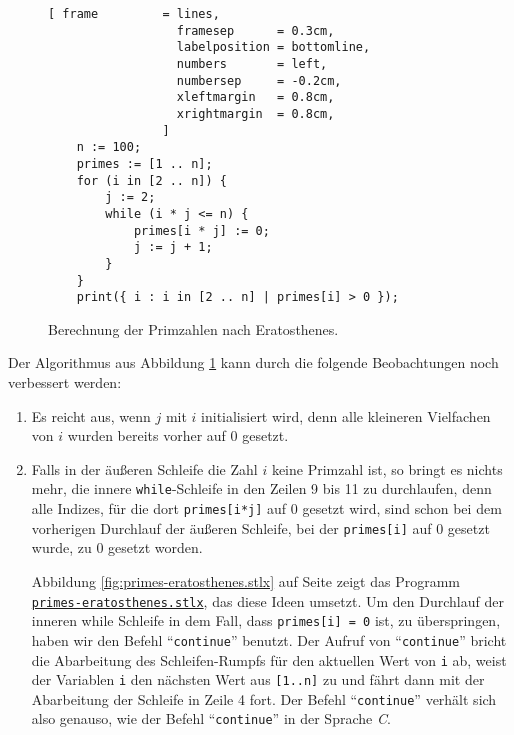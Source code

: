 \begin{figure}[!ht]
  \centering
\begin{Verbatim}[ frame         = lines, 
                  framesep      = 0.3cm, 
                  labelposition = bottomline,
                  numbers       = left,
                  numbersep     = -0.2cm,
                  xleftmargin   = 0.8cm,
                  xrightmargin  = 0.8cm,
                ]
    n := 100;
    primes := [1 .. n];
    for (i in [2 .. n]) {
        j := 2;
        while (i * j <= n) {
            primes[i * j] := 0;
            j := j + 1;
        }
    }
    print({ i : i in [2 .. n] | primes[i] > 0 });
\end{Verbatim} 
\vspace*{-0.3cm}
\caption{Berechnung der Primzahlen nach Eratosthenes.}  \label{fig:primes-for.stlx}
\end{figure} %

Der Algorithmus aus Abbildung \ref{fig:primes-for.stlx} kann durch die folgende Beobachtungen
noch verbessert werden: 
\begin{enumerate}
\item Es reicht aus, wenn $j$ mit $i$ initialisiert wird, denn alle kleineren Vielfachen von $i$
      wurden bereits vorher auf 0 gesetzt.
\item Falls in der äußeren Schleife die Zahl $i$ keine Primzahl ist, so bringt es nichts mehr, die
      innere \texttt{while}-Schleife in den Zeilen 9 bis 11 zu durchlaufen, denn alle
      Indizes, für die dort \texttt{primes[i*j]} auf 0 gesetzt wird, sind schon bei dem
      vorherigen Durchlauf der äußeren Schleife, bei der \texttt{primes[i]}
      auf 0 gesetzt wurde, zu 0 gesetzt worden. 

      Abbildung \ref{fig:primes-eratosthenes.stlx} auf Seite
      \pageref{fig:primes-eratosthenes.stlx} zeigt das Programm
      \href{https://github.com/karlstroetmann/Logik/blob/master/SetlX/primes-eratosthenes.stlx}{\texttt{primes-eratosthenes.stlx}},
      das diese Ideen umsetzt.
      Um den Durchlauf der inneren while Schleife in dem Fall, dass
      \texttt{primes[i] = 0} ist, zu überspringen, haben wir den Befehl ``\texttt{continue}''
      benutzt.  Der Aufruf von ``\texttt{continue}'' bricht die Abarbeitung des
      Schleifen-Rumpfs für den aktuellen Wert von \texttt{i} ab, weist der Variablen
      \texttt{i} den nächsten Wert aus \texttt{[1..n]} zu und fährt dann mit der
      Abarbeitung der Schleife in Zeile 4 fort.  Der Befehl ``\texttt{continue}'' verhält sich
      also genauso, wie der Befehl ``\texttt{continue}'' in der Sprache \textsl{C}.
\end{enumerate}


